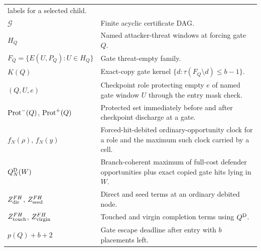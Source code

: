 \begin{appendixtable}
\begin{tabular}{@{}p{}p{}@{}}
      labels for a selected child. \\
    $\mathcal G$ & Finite acyclic certificate DAG. \\
    $H_Q$ & Named attacker-threat windows at forcing gate $Q$. \\
    $F_Q=\{E(U,P_Q):U\in H_Q\}$ & Gate threat-empty family. \\
    $K(Q)$ & Exact-copy gate kernel
      $\{d:\tau(F_Q\setminus d)\le b-1\}$. \\
    $(Q,U,e)$ & Checkpoint role protecting empty $e$ of named gate window
      $U$ through the entry mask check. \\
    $\operatorname{Prot}^-(Q)$, $\operatorname{Prot}^+(Q)$ & Protected set immediately before and after
      checkpoint discharge at a gate. \\
    $f_N(\rho)$, $f_N(y)$ & Forced-hit-debited ordinary-opportunity clock for
      a role and the maximum such clock carried by a cell. \\
    $Q_N^{\mathrm{D}}(W)$ & Branch-coherent maximum of full-cost defender
      opportunities plus exact copied gate hits lying in $W$. \\
    $Z_{\rm dir}^{FH}$, $Z_{\rm seed}^{FH}$ & Direct and seed terms at an
      ordinary debited node. \\
    $Z_{\rm touch}^{FH}$, $Z_{\rm virgin}^{FH}$ & Touched and virgin
      completion terms using $Q^{\mathrm{D}}$. \\
    $p(Q)+b+2$ & Gate escape deadline after entry with $b$ placements left. \\
    \bottomrule
  \end{tabular}
\end{appendixtable}

